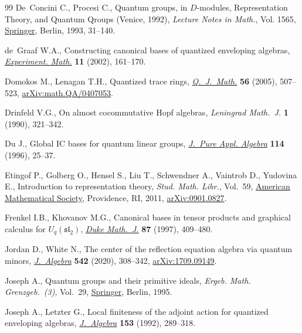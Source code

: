 \documentclass[11pt]{article}
\numberwithin{equation}{section}
\numberwithin{equation}{section}
\theoremstyle{definition}
\begin{document}
\begin{thebibliography}{99}
De~Concini C., Procesi C., Quantum groups, in {$D$}-modules, {R}epresentation
 {T}heory, and {Q}uantum {Q}roups ({V}enice, 1992), \textit{Lecture Notes in
 Math.}, Vol. 1565, \href{https://doi.org/10.1007/BFb0073466}{Springer}, Berlin, 1993, 31--140.

de~Graaf W.A., Constructing canonical bases of quantized enveloping algebras,
 \href{https://doi.org/10.1080/10586458.2002.10504683}{\textit{Experiment. Math.}} \textbf{11} (2002), 161--170.

Domokos M., Lenagan T.H., Quantized trace rings, \href{https://doi.org/10.1093/qmathj/hah051}{\textit{Q.~J.~Math.}}
 \textbf{56} (2005), 507--523, \href{https://arxiv.org/abs/math.QA/0407053}{arXiv:math.QA/0407053}.

Drinfeld V.G., On almost cocommutative {H}opf algebras, \textit{Leningrad
 Math.~J.} \textbf{1} (1990), 321--342.

Du J., Global {IC} bases for quantum linear groups, \href{https://doi.org/10.1016/S0022-4049(96)00045-X}{\textit{J.~Pure Appl.
 Algebra}} \textbf{114} (1996), 25--37.

Etingof P., Golberg O., Hensel S., Liu T., Schwendner A., Vaintrob D., Yudovina
 E., Introduction to representation theory, \textit{Stud. Math. Libr.},
 Vol.~59, \href{https://doi.org/10.1090/stml/059}{American Mathematical Society}, Providence, RI, 2011,
 \href{https://arxiv.org/abs/0901.0827}{arXiv:0901.0827}.

Frenkel I.B., Khovanov M.G., Canonical bases in tensor products and graphical
 calculus for {$U_q(\mathfrak{sl}_2)$}, \href{https://doi.org/10.1215/S0012-7094-97-08715-9}{\textit{Duke Math.~J.}} \textbf{87}
 (1997), 409--480.

Jordan D., White N., The center of the reflection equation algebra via quantum
 minors, \href{https://doi.org/10.1016/j.jalgebra.2019.08.038}{\textit{J.~Algebra}} \textbf{542} (2020), 308--342,
 \href{https://arxiv.org/abs/1709.09149}{arXiv:1709.09149}.

Joseph A., Quantum groups and their primitive ideals, \textit{Ergeb. Math.
 Grenzgeb.~(3)}, Vol.~29, \href{https://doi.org/10.1007/978-3-642-78400-2}{Springer}, Berlin, 1995.

Joseph A., Letzter G., Local finiteness of the adjoint action for quantized
 enveloping algebras, \href{https://doi.org/10.1016/0021-8693(92)90157-H}{\textit{J.~Algebra}} \textbf{153} (1992), 289--318.


\end{thebibliography}
\end{document}
